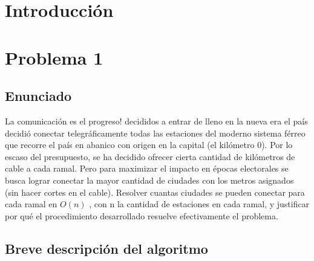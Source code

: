 \documentclass{article}
\theoremstyle{definition}
\theoremstyle{remark}
\begin{document}
{} %

\subtitulo{}
\grupo{}

 
\maketitle

\pagebreak

\tableofcontents

\pagebreak

\section{Introducción}

\section{Problema 1}

\subsection{Enunciado}
La comunicación es el progreso! decididos a entrar de lleno en la nueva era el país decidió conectar telegráficamente todas las estaciones del moderno sistema férreo que recorre el país en abanico con origen en la capital (el kilómetro 0). Por lo escaso del presupuesto, se ha decidido ofrecer cierta cantidad de kilómetros de cable a cada ramal. Pero para maximizar el impacto en épocas electorales se busca lograr conectar la mayor cantidad de ciudades con los metros asignados (sin hacer cortes en el cable).
Resolver cuantas ciudades se pueden conectar para cada ramal en $O(n)$ , con n la cantidad de estaciones en cada ramal, y justificar por qué el procedimiento desarrollado resuelve efectivamente el problema.

\subsection{Breve descripción del algoritmo}
\end{document}
